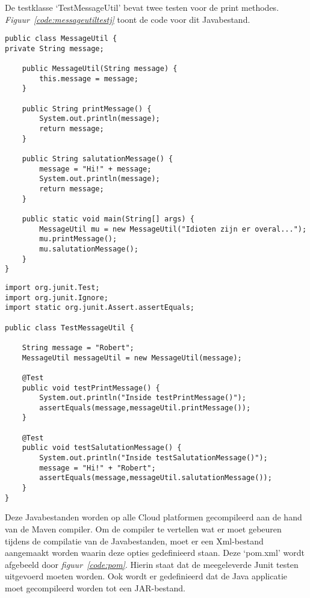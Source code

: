 De testklasse ‘TestMessageUtil’ bevat twee testen voor de print methodes. \emph{Figuur~\ref{code:messageutiltestj}}  toont de code voor dit Javabestand.

\begin{lstlisting}
public class MessageUtil {
private String message;

    public MessageUtil(String message) {
        this.message = message;
    }

    public String printMessage() {
        System.out.println(message);
        return message;
    }

    public String salutationMessage() {
        message = "Hi!" + message;
        System.out.println(message);
        return message;
    }
    
    public static void main(String[] args) {
        MessageUtil mu = new MessageUtil("Idioten zijn er overal...");
        mu.printMessage();
        mu.salutationMessage();
    }
}
\end{lstlisting}

\begin{lstlisting}
import org.junit.Test;
import org.junit.Ignore;
import static org.junit.Assert.assertEquals;

public class TestMessageUtil {

    String message = "Robert";    
    MessageUtil messageUtil = new MessageUtil(message);

    @Test
    public void testPrintMessage() {      
        System.out.println("Inside testPrintMessage()");     
        assertEquals(message,messageUtil.printMessage());
    }

    @Test
    public void testSalutationMessage() {
        System.out.println("Inside testSalutationMessage()");
        message = "Hi!" + "Robert";
        assertEquals(message,messageUtil.salutationMessage());
    }
}
\end{lstlisting}

Deze Javabestanden worden op alle Cloud platformen gecompileerd aan de hand van de Maven compiler. Om de compiler te vertellen wat er moet gebeuren tijdens de compilatie van de Javabestanden, moet er een Xml-bestand aangemaakt worden waarin deze opties gedefinieerd staan. Deze ‘pom.xml’ wordt afgebeeld door \emph{figuur~\ref{code:pom}}. Hierin staat dat de meegeleverde Junit testen uitgevoerd moeten worden. Ook wordt er gedefinieerd dat de Java applicatie moet gecompileerd worden tot een JAR-bestand.


